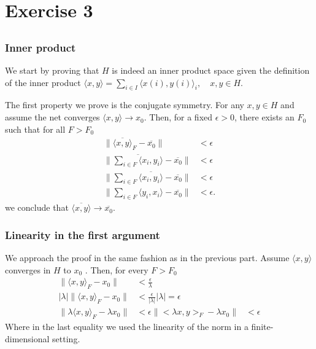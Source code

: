 \documentclass[a4paper,12pt]{article} %
\begin{document}
\section{Exercise 3}
\subsection{}
\subsubsection{Inner product}
We start by proving that \(H\) is indeed an inner product space given the definition of the inner product \(\langle x, y \rangle = \sum_{i \in I} \langle x(i), y(i) \rangle_i, \quad x, y \in H.
\)

The first property we prove is the conjugate symmetry.
For any \(x,y \in H\) and assume the net converges \(\langle x,y \rangle  \to  x_0\). Then, for a fixed \(\epsilon >0\), there exists an \(F_0\) such that for all \(F>F_0\)
\begin{align*}
    \| \overline{\langle x,y \rangle }_F - \overline{x_0}    \|                 & <\epsilon  \\
    \| \overline{\sum_{i \in  F}\langle x_i,y_i \rangle } - \overline{x_0}   \| & < \epsilon \\
    \| \sum_{i \in  F}\overline{\langle x_i,y_i \rangle }  -\overline{x_0}  \|  & < \epsilon \\
    \| \sum_{i \in  F}\langle y_i, x_i \rangle -\overline{ x_0}  \|             & <\epsilon.
\end{align*}
we conclude that \(\overline{\langle x,y \rangle } \to \overline{x_0}  \).

\subsubsection{Linearity in the first argument}
We approach the proof in the same fashion as in the previous part. Assume \(\langle x,y \rangle \) converges in \(H\) to \(x_0\) .
Then, for every \(F>F_0\)
\begin{align*}
    \| \langle x,y \rangle_F -x_0 \|                   & < \frac{\epsilon }{\lambda }                        \\
    |\lambda |\| \langle x,y \rangle_F -x_0 \|         & < \frac{\epsilon}{|\lambda |} |\lambda | = \epsilon \\
    \| \lambda \langle x,y \rangle_F - \lambda x_0  \| & < \epsilon
    \| <\lambda x, y> _F - \lambda x_0 \|              & < \epsilon
\end{align*}
Where in the last equality we used the linearity of the norm in a finite-dimensional setting.
\end{document}
